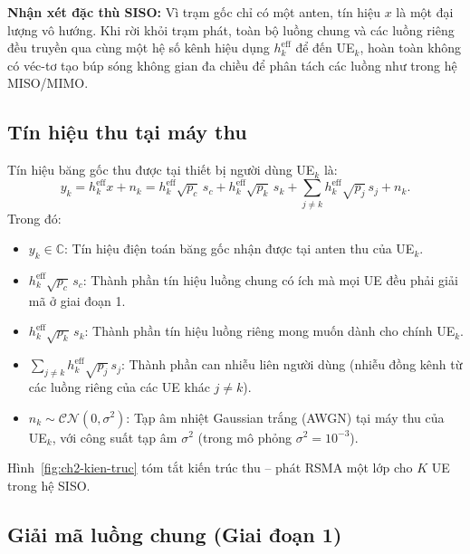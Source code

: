 \textbf{Nhận xét đặc thù SISO:} Vì trạm gốc chỉ có một anten, tín hiệu $x$ là một đại lượng vô hướng. Khi
rời khỏi trạm phát, toàn bộ luồng chung và các luồng riêng đều truyền qua cùng một hệ số kênh hiệu dụng
$h^{\mathrm{eff}}_k$ để đến UE$_k$, hoàn toàn không có véc-tơ tạo búp sóng không gian đa chiều để phân tách
các luồng như trong hệ MISO/MIMO.

\subsection{Tín hiệu thu tại máy thu}
\label{ssec:tin-hieu-thu}

Tín hiệu băng gốc thu được tại thiết bị người dùng UE$_k$ là:
\begin{equation}
y_k = h^{\mathrm{eff}}_k x + n_k
= h^{\mathrm{eff}}_k \sqrt{p_c}\, s_c + h^{\mathrm{eff}}_k \sqrt{p_k}\, s_k
+ \sum_{j \neq k} h^{\mathrm{eff}}_k \sqrt{p_j}\, s_j + n_k .
\label{eq:tin-hieu-thu}
\end{equation}
Trong đó:
\begin{itemize}
\item $y_k \in \mathbb{C}$: Tín hiệu điện toán băng gốc nhận được tại anten thu của UE$_k$.
\item $h^{\mathrm{eff}}_k \sqrt{p_c}\, s_c$: Thành phần tín hiệu luồng chung có ích mà mọi UE đều phải giải mã
  ở giai đoạn 1.
\item $h^{\mathrm{eff}}_k \sqrt{p_k}\, s_k$: Thành phần tín hiệu luồng riêng mong muốn dành cho chính UE$_k$.
\item $\sum_{j \neq k} h^{\mathrm{eff}}_k \sqrt{p_j}\, s_j$: Thành phần can nhiễu liên người dùng (nhiễu đồng
  kênh từ các luồng riêng của các UE khác $j \neq k$).
\item $n_k \sim \mathcal{CN}(0, \sigma^2)$: Tạp âm nhiệt Gaussian trắng (AWGN) tại máy thu của UE$_k$, với
  công suất tạp âm $\sigma^2$ (trong mô phỏng $\sigma^2 = 10^{-3}$).
\end{itemize}
Hình~\ref{fig:ch2-kien-truc} tóm tắt kiến trúc thu -- phát RSMA một lớp cho $K$ UE trong hệ SISO.



\subsection{Giải mã luồng chung (Giai đoạn 1)}
\label{ssec:giai-ma-chung}

